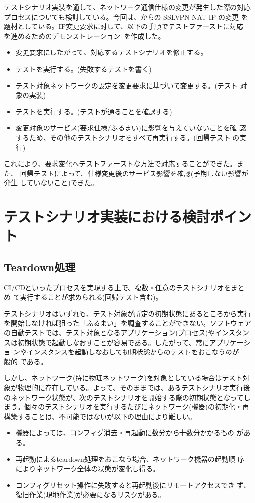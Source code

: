 テストシナリオ実装を通して、ネットワーク通信仕様の変更が発生した際の対応
プロセスについても検討している。今回は、\tj からの SSLVPN NAT IP の変更
を題材としている。IP変更要求に対して、以下の手順でテストファーストに対応
を進めるためのデモンストレーション~\cite{nettester-demo-movie}を作成した。
\begin{itemize}
 \item 変更要求にしたがって、対応するテストシナリオを修正する。
 \item テストを実行する。(失敗するテストを書く)
 \item テスト対象ネットワークの設定を変更要求に基づいて変更する。(テスト
       対象の実装)
 \item テストを実行する。(テストが通ることを確認する)
 \item 変更対象のサービス(要求仕様/ふるまい)に影響を与えていないことを確
       認するため、その他のテストシナリオをすべて再実行する。(回帰テスト
       の実行)
\end{itemize}
これにより、要求変化へテストファーストな方法で対応することができた。また、
回帰テストによって、仕様変更後のサービス影響を確認(予期しない影響が発生
していないこと)できた。

 \section{テストシナリオ実装における検討ポイント}
 \label{sec:testscenario-impl-point}

  \subsection{Teardown処理}
  \label{sec:teardown}
CI/CDといったプロセスを実現する上で、複数・任意のテストシナリオをまとめ
て実行することが求められる(回帰テスト含む)。

テストシナリオはいずれも、テスト対象が所定の初期状態にあるところから実行
を開始しなければ狙った「ふるまい」を調査することができない。ソフトウェア
の自動テストでは、テスト対象となるアプリケーション(プロセス)やインスタン
スは初期状態で起動しなおすことが容易である。したがって、常にアプリケーショ
ンやインスタンスを起動しなおして初期状態からのテストをおこなうのが一般的
である。

しかし、ネットワーク(特に物理ネットワーク)を対象としている場合はテスト対
象が物理的に存在している。よって、そのままでは、あるテストシナリオ実行後
のネットワーク状態が、次のテストシナリオを開始する際の初期状態となってし
まう。個々のテストシナリオを実行するたびにネットワーク(機器)の初期化・再
構築することは、不可能ではないが以下の理由により難しい。
\begin{itemize}
 \item 機器によっては、コンフィグ消去・再起動に数分から十数分かかるもの
       がある。
 \item 再起動によるteardown処理をおこなう場合、ネットワーク機器の起動順
       序によりネットワーク全体の状態が変化し得る。
 \item コンフィグリセット操作に失敗すると再起動後にリモートアクセスでき
       ず、復旧作業(現地作業)が必要になるリスクがある。
\end{itemize}


